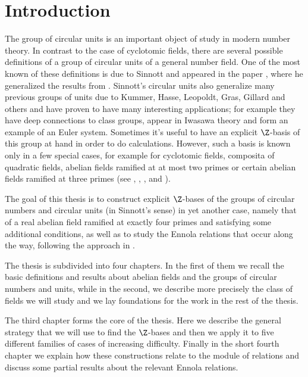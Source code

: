 \chapter*{Introduction}

The group of circular units is an important object of study in modern number theory. In contrast to the case of cyclotomic fields, there are several possible definitions of a group of circular units of a general number field. One of the most known of these definitions is due to Sinnott and appeared in the paper \citep{SinnottAb}, where he generalized the results from \citep{SinnottCirc}. Sinnott's circular units also generalize many previous groups of units due to Kummer, Hasse, Leopoldt, Gras, Gillard and others and have proven to have many interesting applications; for example they have deep connections to class groups, appear in Iwasawa theory and form an example of an Euler system. Sometimes it's useful to have an explicit $\Z$-basis of this group at hand in order to do calculations. However, such a basis is known only in a few special cases, for example for cyclotomic fields, composita of quadratic fields, abelian fields ramified at at most two primes or certain abelian fields ramified at three primes (see \citep{Kucera1992}, \citep{Kucera1996}, \citep{Dohmae1996}, \citep{Dohmae1997} and \citep{Kucera2016}).
\bigskip

The goal of this thesis is to construct explicit $\Z$-bases of the groups of circular numbers and circular units (in Sinnott's sense) in yet another case, namely that of a real abelian field ramified at exactly four primes and satisfying some additional conditions, as well as to study the Ennola relations that occur along the way, following the approach in \citep{Kucera2016}. \medskip

The thesis is subdivided into four chapters. In the first of them we recall the basic definitions and results about abelian fields and the groups of circular numbers and units, while in the second, we describe more precisely the class of fields we will study and we lay foundations for the work in the rest of the thesis.\medskip

The third chapter forms the core of the thesis. Here we describe the general strategy that we will use to find the $\Z$-bases and then we apply it to five different families of cases of increasing difficulty. Finally in the short fourth chapter we explain how these constructions relate to the module of relations and discuss some partial results about the relevant Ennola relations.\medskip

